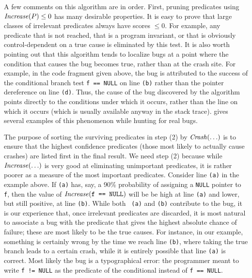 A few comments on this algorithm are in order.  First, pruning
predicates using $\mbox{\textit{Increase}}(P) \leq 0$ has many desirable
properties.  It is easy to prove that large classes of irrelevant
predicates always have scores $\leq 0$.  For example, any predicate
that is not reached, that is a program invariant, or that is obviously
control-dependent on a true cause is eliminated by this test.  It is
also worth pointing out that this algorithm tends to localize bugs at
a point where the condition that causes the bug becomes true, rather than at
the crash site.  For example, in the code fragment given above, the bug is
attributed to the success of the conditional branch test {\tt f ==
NULL} on line {\tt (b)} rather than the pointer dereference on line
{\tt (d)}.  Thus, the cause of the bug discovered by the algorithm
points directly to the conditions under which it occurs, rather than
the line on which it occurs (which is usually available anyway in the
stack trace).  gives several examples
of this phenomenon while hunting for real bugs.


The purpose of sorting the surviving predicates in step (2) by
$\mbox{\textit{Crash}}(\ldots)$ is to ensure that the highest confidence predicates (those
most likely to actually cause crashes) are listed first in the final
result.  We need step (2) because while $\mbox{\textit{Increase}}(\ldots)$ is very good at
eliminating unimportant predicates, it is rather poorer as a measure
of the most important predicates.  Consider line {\tt (a)} in the
example above.  If {\tt (a)} has, say, a 90\% probability of assigning
a {\tt NULL} pointer to {\tt f}, then the value of
$\mbox{\textit{Increase}}(\mbox{\tt f == NULL})$ will be be high at line {\tt (a)}
and lower, but still positive, at line {\tt (b)}.  While both {\tt
(a)} and {\tt (b)} contribute to the bug, it is our experience that,
once irrelevant predicates are discarded, it is most natural to
associate a bug with the predicate that gives the highest absolute
chance of failure; these are most likely to be the true causes.  For
instance, in our example, something is certainly wrong by the time we
reach line {\tt (b)}, where taking the true branch leads to a certain
crash, while it is entirely possible that line {\tt (a)} is correct.
Most likely the bug is a typographical error: the programmer meant to
write {\tt f != NULL} as the predicate of the conditional instead of
{\tt f == NULL}.

